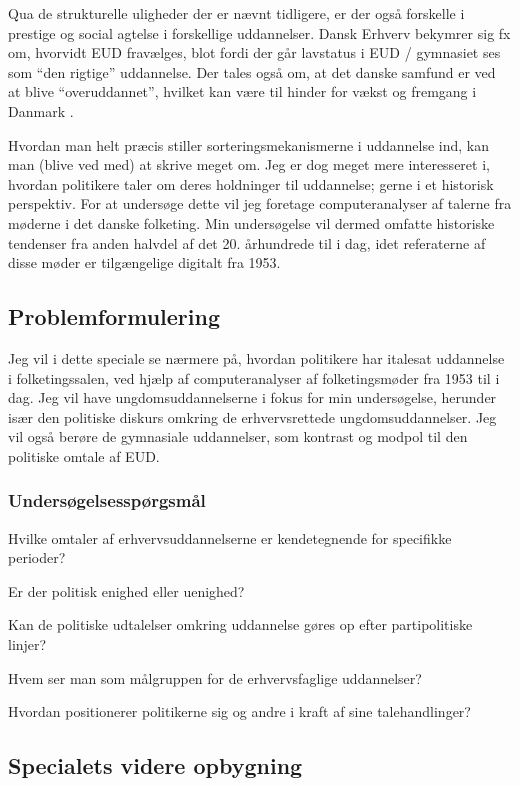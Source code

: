 Qua de strukturelle uligheder der er nævnt tidligere, er der også forskelle i prestige og social agtelse i forskellige uddannelser.
Dansk Erhverv bekymrer sig fx om, hvorvidt EUD fravælges, blot fordi der går lavstatus i EUD / gymnasiet ses som “den rigtige” uddannelse.
Der tales også om, at det danske samfund er ved at blive “overuddannet”, hvilket kan være til hinder for vækst og fremgang i Danmark \autocite{simonsenLadOsGore2016}.

Hvordan man helt præcis stiller sorteringsmekanismerne i uddannelse ind, kan man (blive ved med) at skrive meget om.
Jeg er dog meget mere interesseret i, hvordan politikere taler om deres holdninger til uddannelse; gerne i et historisk perspektiv.
For at undersøge dette vil jeg foretage computeranalyser af talerne fra møderne i det danske folketing.
Min undersøgelse vil dermed omfatte historiske tendenser fra anden halvdel af det 20. århundrede til i dag, idet referaterne af disse møder er tilgængelige digitalt fra 1953.

\subsection{Problemformulering}
\label{sec:pf}
Jeg vil i dette speciale se nærmere på, hvordan politikere har italesat uddannelse i folketingssalen, ved hjælp af computeranalyser af folketingsmøder fra 1953 til i dag.
Jeg vil have ungdomsuddannelserne i fokus for min undersøgelse, herunder især den politiske diskurs omkring de erhvervsrettede ungdomsuddannelser.
Jeg vil også berøre de gymnasiale uddannelser, som kontrast og modpol til den politiske omtale af EUD.

\subsubsection{Undersøgelsesspørgsmål}
\label{sec:res-qs}

Hvilke omtaler af erhvervsuddannelserne er kendetegnende for specifikke perioder?

Er der politisk enighed eller uenighed?

Kan de politiske udtalelser omkring uddannelse gøres op efter partipolitiske linjer?

Hvem ser man som målgruppen for de erhvervsfaglige uddannelser?

Hvordan positionerer politikerne sig og andre i kraft af sine talehandlinger?

\subsection{Specialets videre opbygning}
\label{sec:structure}

